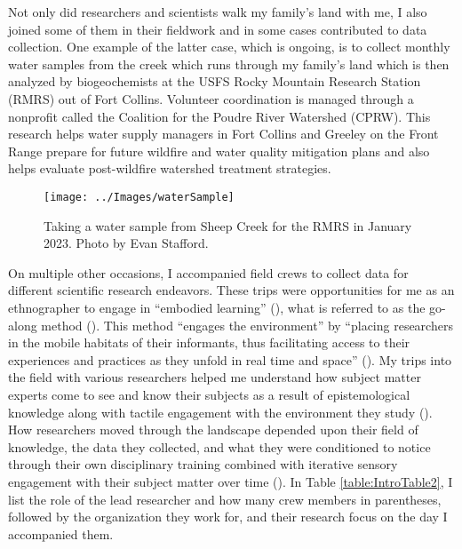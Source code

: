 \documentclass[
]{article}
\begin{document}
Not only did researchers and scientists walk my family's land with me, I also joined some of them in their fieldwork and in some cases contributed to data collection. One example of the latter case, which is ongoing, is to collect monthly water samples from the creek which runs through my family's land which is then analyzed by biogeochemists at the USFS Rocky Mountain Research Station (RMRS) out of Fort Collins. Volunteer coordination is managed through a nonprofit called the Coalition for the Poudre River Watershed (CPRW). This research helps water supply managers in Fort Collins and Greeley on the Front Range prepare for future wildfire and water quality mitigation plans and also helps evaluate post-wildfire watershed treatment strategies.

\begin{figure}
\texttt{[image: ../Images/waterSample]} \caption[Sheep Creek water sample]{Taking a water sample from Sheep Creek for the RMRS in January 2023. Photo by Evan Stafford.}\label{fig:figureTitle5}
\end{figure}

On multiple other occasions, I accompanied field crews to collect data for different scientific research endeavors. These trips were opportunities for me as an ethnographer to engage in ``embodied learning'' (), what is referred to as the go-along method (). This method ``engages the environment'' by ``placing researchers in the mobile habitats of their informants, thus facilitating access to their experiences and practices as they unfold in real time and space'' (). My trips into the field with various researchers helped me understand how subject matter experts come to see and know their subjects as a result of epistemological knowledge along with tactile engagement with the environment they study (). How researchers moved through the landscape depended upon their field of knowledge, the data they collected, and what they were conditioned to notice through their own disciplinary training combined with iterative sensory engagement with their subject matter over time (). In Table \ref{table:IntroTable2}, I list the role of the lead researcher and how many crew members in parentheses, followed by the organization they work for, and their research focus on the day I accompanied them.
\end{document}
